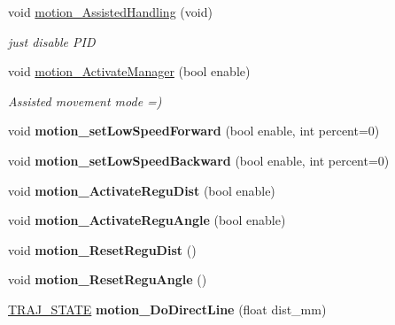 \begin{DoxyCompactItemize}
void \hyperlink{classAsservEsialR_a6bcff182c51cf9de8c80f38f33267bae}{motion\+\_\+\+Assisted\+Handling} (void)
\begin{DoxyCompactList}\small\item\em just disable P\+ID \end{DoxyCompactList}\item 
\mbox{\label{classAsservEsialR_adf00fba115e602267a590236182094ac}} 
void \hyperlink{classAsservEsialR_adf00fba115e602267a590236182094ac}{motion\+\_\+\+Activate\+Manager} (bool enable)
\begin{DoxyCompactList}\small\item\em Assisted movement mode =) \end{DoxyCompactList}\item 
\mbox{\label{classAsservEsialR_a2d5e1f02b80ab67a449ab10cff18c0db}} 
void {\bfseries motion\+\_\+set\+Low\+Speed\+Forward} (bool enable, int percent=0)
\item 
\mbox{\label{classAsservEsialR_a384c4439d8044cd32a04474daabc2cad}} 
void {\bfseries motion\+\_\+set\+Low\+Speed\+Backward} (bool enable, int percent=0)
\item 
\mbox{\label{classAsservEsialR_a810745ed547a8e4423a6462b1ae57541}} 
void {\bfseries motion\+\_\+\+Activate\+Regu\+Dist} (bool enable)
\item 
\mbox{\label{classAsservEsialR_a45955ed75acd253f4ba4a0af80b302a3}} 
void {\bfseries motion\+\_\+\+Activate\+Regu\+Angle} (bool enable)
\item 
\mbox{\label{classAsservEsialR_ad9fbdcb0e63ee5dad5d4cc3668173b56}} 
void {\bfseries motion\+\_\+\+Reset\+Regu\+Dist} ()
\item 
\mbox{\label{classAsservEsialR_a28d2d57f9040f90d94e4ab6254c22fc3}} 
void {\bfseries motion\+\_\+\+Reset\+Regu\+Angle} ()
\item 
\mbox{\label{classAsservEsialR_a08fc904da0513ea35c524958f8cc6df0}} 
\hyperlink{path__manager_8h_adb3360abeb29758da93865c8afcb80eb}{T\+R\+A\+J\+\_\+\+S\+T\+A\+TE} {\bfseries motion\+\_\+\+Do\+Direct\+Line} (float dist\+\_\+mm)

\end{DoxyCompactItemize}
